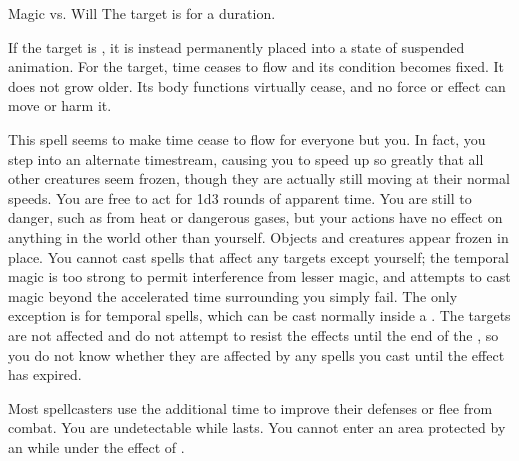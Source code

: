 \begin{spellheader}
    \begin{spelltargetinginfo}
    \end{spelltargetinginfo}
    \begin{spelleffects}
    \end{spelleffects}
\end{spellheader}
\begin{spellcontent}
    \begin{spellattack}{Magic vs. Will}
        \spellsuccess The target is \slowed for a \durlong duration.

        If the target is \bloodied, it is instead permanently placed into a state of suspended animation. For the target, time ceases to flow and its condition becomes fixed. It does not grow older. Its body functions virtually cease, and no force or effect can move or harm it.
    \end{spellattack}
\end{spellcontent}
\begin{spellfooter}

\end{spellfooter}

\begin{spellheader}
\end{spellheader}
\begin{spellcontent}
    \spelleffect This spell seems to make time cease to flow for everyone but you. In fact, you step into an alternate timestream, causing you to speed up so greatly that all other creatures seem frozen, though they are actually still moving at their normal speeds. You are free to act for 1d3 rounds of apparent time. You are still \vulnerable to danger, such as from heat or dangerous gases, but your actions have no effect on anything in the world other than yourself. Objects and creatures appear frozen in place. You cannot cast spells that affect any targets except yourself; the temporal magic is too strong to permit interference from lesser magic, and attempts to cast magic beyond the accelerated time surrounding you simply fail. The only exception is for temporal spells, which can be cast normally inside a . The targets are not affected and do not attempt to resist the effects until the end of the , so you do not know whether they are affected by any spells you cast until the effect has expired.
\end{spellcontent}
\begin{spellfooter}
    \spellnotes Most spellcasters use the additional time to improve their defenses or flee from combat. You are undetectable while  lasts. You cannot enter an area protected by an  while under the effect of .
\end{spellfooter}

